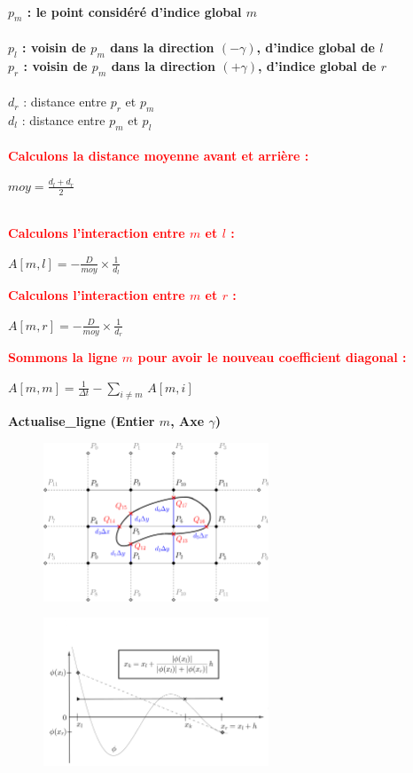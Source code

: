 \documentclass[11pt,a4paper]{article}
\begin{document}
\begin{algorithm}[H]
\SetAlgoLined
~\\
\textbf{$p_m$ : le point considéré d'indice global $m$}\\
~\\

\textbf{$p_l$ : voisin de $p_m$ dans la direction $(-\gamma)$, d'indice global de $l$}\\
\textbf{$p_r$ : voisin de $p_m$ dans la direction $(+\gamma)$, d'indice global de $r$}\\
~\\
$d_r$ : distance entre $p_r$ et $p_m$\\
$d_l$ : distance entre $p_m$ et $p_l$\\
~\\
\textcolor{red}{\textbf{Calculons la distance moyenne avant et arrière :}}
\begin{center}
$\displaystyle moy = \frac{d_l + d_r}{2}$\\
\end{center}
~\\
\textcolor{red}{\textbf{Calculons l'interaction entre $m$ et $l$ :}}
\begin{center}
$A [m, l] = \displaystyle - \frac{D}{moy} \times \frac{1}{d_l}$
\end{center}
\textcolor{red}{\textbf{Calculons l'interaction entre $m$ et $r$ :}}
\begin{center}
$A [m, r] = \displaystyle - \frac{D}{moy} \times \frac{1}{d_r}$
\end{center}
\textcolor{red}{\textbf{Sommons la ligne $m$ pour avoir le nouveau coefficient diagonal :}}
\begin{center}
$A[m,m] = \displaystyle \frac{1}{\Delta t}-\sum_{i\neq m}\,A[m, i]$
\end{center}

\caption{\textbf{Actualise\_ligne (Entier $m$, Axe $\gamma$)}}
\end{algorithm}

\begin{figure}
\centering
\includegraphics[width=0.6\textwidth]{domain_2d.png}
\end{figure}

\begin{figure}
\centering
\includegraphics[width=0.6\textwidth]{phi_arete.png}
\end{figure}
\end{document}

